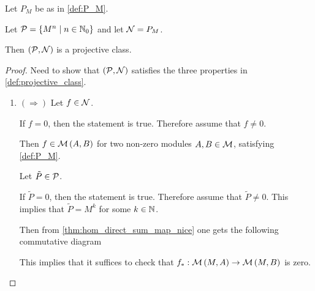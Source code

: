 \begin{example}
    Let \( P_M \) be as in \autoref{def:P_M}.

    Let \( {\mathcal{P}} = \left\{ M^n \mid n \in {\mathbb{N}}_0 \right\} \) and let \( {\mathcal{N}} = P_M \).

    Then \( ({\mathcal{P}}, {\mathcal{N}}) \) is a projective class.
\end{example}
\begin{proof}
    Need to show that \( ({\mathcal{P}}, {\mathcal{N}}) \) satisfies the three properties in \autoref{def:projective_class}.

    \begin{enumerate}
        \item {
            \( (\Rightarrow) \) Let \( f \in {\mathcal{N}} \).

            If \( f = 0 \), then the statement is true. Therefore assume that \( f \neq 0 \).

            Then \( f \in {\mathcal{M}}\left( A, B \right) \) for two non-zero modules \( A, B \in {\mathcal{M}} \), satisfying \autoref{def:P_M}.

            Let \( \tilde{P} \in {\mathcal{P}} \).
            
            If \( \tilde{P} = 0 \), then the statement is true. Therefore assume that \( \tilde{P} \neq 0 \). This implies that \( \tilde{P} = M^k \) for some \( k \in {\mathbb{N}} \).

            Then from \autoref{thm:hom_direct_sum_map_nice} one gets the following commutative diagram
            \begin{center}
            \end{center}
            This implies that it suffices to check that \( f_*: {\mathcal{M}}\left( M, A \right) \to {\mathcal{M}}\left( M, B \right) \) is zero.

}
\end{enumerate}
\end{proof}
